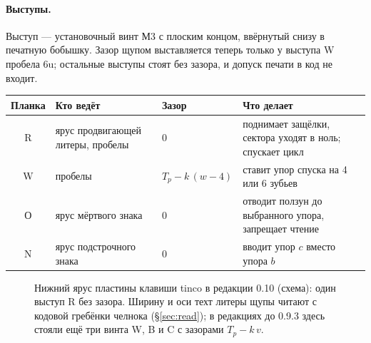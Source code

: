 \paragraph{Выступы.} Выступ — установочный винт М3 с плоским концом, ввёрнутый снизу в печатную бобышку. Зазор щупом выставляется теперь только у выступа W пробела 6u; остальные выступы стоят без зазора, и допуск печати в код не входит.

\begin{center}\small
\begin{tabularx}{\linewidth}{@{}c>{\raggedright}p{38mm}l>{\raggedright\arraybackslash}X@{}}
\toprule
Планка & Кто ведёт & Зазор & Что делает \\
\midrule
R & ярус продвигающей литеры, пробелы & 0 & поднимает защёлки, сектора уходят в ноль; спускает цикл \\
W & пробелы & $T_p - k\,(w-4)$ & ставит упор спуска на 4 или 6 зубьев \\
О & ярус мёртвого знака & 0 & отводит ползун до выбранного упора, запрещает чтение \\
N & ярус подстрочного знака & 0 & вводит упор $c$ вместо упора $b$ \\
\bottomrule
\end{tabularx}
\end{center}

\begin{figure}[h]
\centering
{}
\caption{Нижний ярус пластины клавиши tinco в редакции 0.10 (схема): один выступ R без зазора. Ширину и оси техт литеры щупы читают с кодовой гребёнки челнока (\S\ref{sec:read}); в редакциях до 0.9.3 здесь стояли ещё три винта W, B и C с зазорами $T_p - k\,v$.}
\label{fig:plate}
\end{figure}

